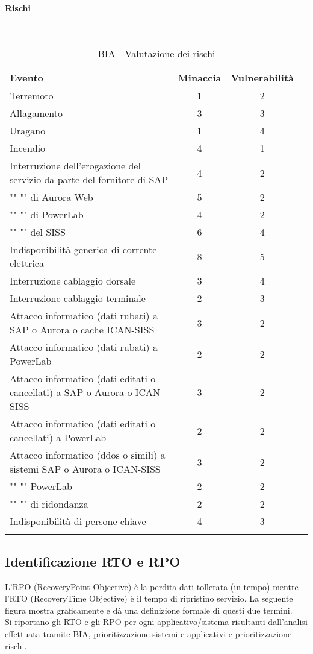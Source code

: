 \paragraph{Rischi}
\textcolor{white}{.} \\
\renewcommand\arraystretch{1,5}
\begin{longtable}{p{7cm} c c c }
\toprule
\textbf{Evento} & \textbf{Minaccia} & \textbf{Vulnerabilità}\\
\toprule
Terremoto & 1 & 2 \\
Allagamento & 3 & 3 \\
Uragano & 1 & 4 \\
Incendio & 4 & 1 \\
Interruzione dell'erogazione del servizio da parte del fornitore di SAP & 4 & 2 \\
"" "" di Aurora Web & 5 & 2 \\
"" "" di PowerLab & 4 & 2 \\
"" "" del SISS & 6 & 4 \\
Indisponibilità generica di corrente elettrica & 8 & 5 \\
Interruzione cablaggio dorsale & 3 & 4 \\
Interruzione cablaggio terminale & 2 & 3 \\
Attacco informatico (dati rubati) a SAP o Aurora o cache ICAN-SISS& 3 & 2 \\
Attacco informatico (dati rubati) a PowerLab& 2 & 2 \\
Attacco informatico (dati editati o cancellati) a SAP o Aurora o ICAN-SISS& 3 & 2 \\
Attacco informatico (dati editati o cancellati) a PowerLab& 2 & 2 \\
Attacco informatico (ddos o simili) a sistemi SAP o Aurora o ICAN-SISS& 3 & 2 \\
"" "" PowerLab & 2 & 2 \\
"" "" di ridondanza& 2 & 2 \\
Indisponibilità di persone chiave & 4 & 3 \\
\bottomrule
\caption{BIA - Valutazione dei rischi}
\end{longtable}


\newpage
\subsection{Identificazione RTO e RPO}
\label{rtorpo}
L'RPO (RecoveryPoint Objective) è la perdita dati tollerata (in tempo) mentre l'RTO (RecoveryTime Objective) è il tempo di ripristino servizio. La seguente figura mostra graficamente e dà una definizione formale di questi due termini. \\ Si riportano gli RTO e gli RPO per ogni applicativo/sistema risultanti dall'analisi effettuata tramite BIA, prioritizzazione sistemi e applicativi e prioritizzazione rischi.

